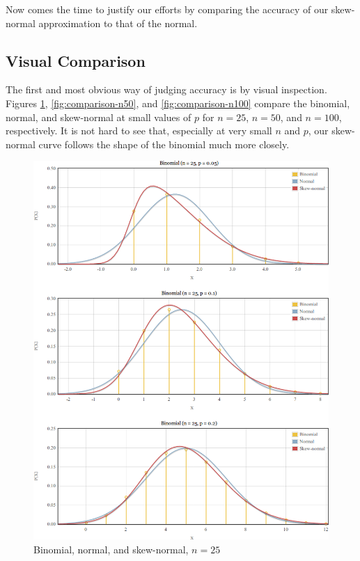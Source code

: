 \documentclass{article}
\begin{document}
Now comes the time to justify our efforts by comparing the accuracy of our
skew-normal approximation to that of the normal.

\subsection{Visual Comparison}

The first and most obvious way of judging accuracy is by visual inspection.
Figures \ref{fig:comparison-n25}, \ref{fig:comparison-n50}, and
\ref{fig:comparison-n100} compare the binomial, normal, and skew-normal at
small values of $p$ for $n=25$, $n=50$, and $n=100$, respectively. It is not
hard to see that, especially at very small $n$ and $p$, our skew-normal curve
follows the shape of the binomial much more closely.

\begin{figure}
  \centering
  \includegraphics[width=\textwidth]{../graphs/images/comparison-n25.png}
  \caption{Binomial, normal, and skew-normal, $n=25$}
  \label{fig:comparison-n25}
\end{figure}
\end{document}
